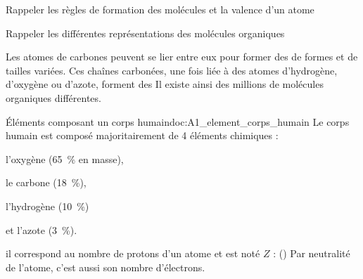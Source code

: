 \teteTermStssOrga

\vspace*{-30pt}

\begin{objectifs}
  \item Rappeler les règles de formation des molécules et la valence d'un atome
  \item Rappeler les différentes représentations des molécules organiques
\end{objectifs}

\begin{contexte}
  Les atomes de carbones peuvent se lier entre eux pour former des  de formes et de tailles variées.
  Ces chaînes carbonées, une fois liée à des atomes d'hydrogène, d'oxygène ou d'azote, forment des 
  Il existe ainsi des millions de molécules organiques différentes.

\end{contexte}


\vspace*{-8pt}
\vspace*{-8pt}

\begin{doc}{Éléments composant un corps humain}{doc:A1_element_corps_humain}
  Le corps humain est composé majoritairement de 4 éléments chimiques :
  \vspace*{-4pt}
  \begin{multicols}{2}
  \begin{listePoints}
    \item l'oxygène   \oxygene (\qty{65}{\percent} en masse),
    \item le carbone  \carbone (\qty{18}{\percent}),
    \item l'hydrogène \hydrogene (\qty{10}{\percent})
    \item et l'azote   (\qty{3}{\percent}).
  \end{listePoints}
  \end{multicols}
  
  \begin{importants}
     il correspond au nombre de protons d'un atome et est noté $Z$ :  (\hspace{-8pt}\exemple {})
    Par neutralité de l'atome, c'est aussi son nombre d'électrons.
  \end{importants}
\end{doc}


